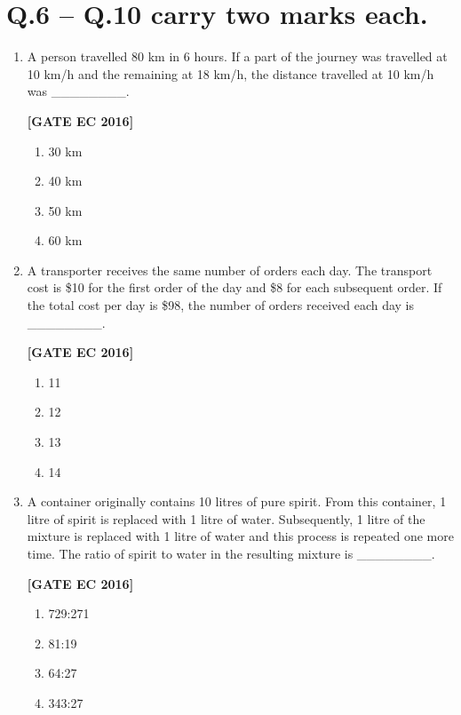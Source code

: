 \documentclass[12pt]{article}
\begin{document}
\section*{Q.6 -- Q.10 carry two marks each.}
\begin{enumerate}[label=\textbf{Q.\arabic*.}, start=6, itemsep=2em]

\item A person travelled 80 km in 6 hours. If a part of the journey was travelled at 10 km/h and the remaining at 18 km/h, the distance travelled at 10 km/h was \_\_\_\_\_\_\_\_.

\noindent \textbf{[GATE EC 2016]}

\begin{multicols}{4}
\begin{enumerate}[label=\Alph*.]
    \item 30 km
    \item 40 km
    \item 50 km
    \item 60 km
\end{enumerate}
\end{multicols}

\item A transporter receives the same number of orders each day. The transport cost is \$10 for the first order of the day and \$8 for each subsequent order. If the total cost per day is \$98, the number of orders received each day is \_\_\_\_\_\_\_\_.

\noindent \textbf{[GATE EC 2016]}

\begin{multicols}{4}
\begin{enumerate}[label=\Alph*.]
    \item 11
    \item 12
    \item 13
    \item 14
\end{enumerate}
\end{multicols}

\item A container originally contains 10 litres of pure spirit. From this container, 1 litre of spirit is replaced with 1 litre of water. Subsequently, 1 litre of the mixture is replaced with 1 litre of water and this process is repeated one more time. The ratio of spirit to water in the resulting mixture is \_\_\_\_\_\_\_\_.

\noindent \textbf{[GATE EC 2016]}

\begin{multicols}{4}
\begin{enumerate}[label=\Alph*.]
    \item 729:271
    \item 81:19
    \item 64:27
    \item 343:27
\end{enumerate}
\end{multicols}


\end{enumerate}
\end{document}
